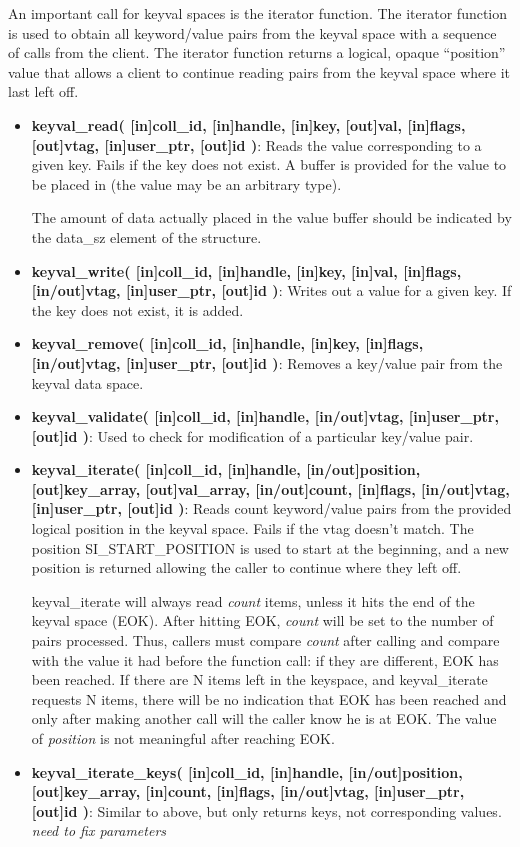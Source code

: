 \documentclass[10pt]{article} %
\begin{document}
An important call for keyval spaces is the iterator function.  The
iterator function is used to obtain all keyword/value pairs from the
keyval space with a sequence of calls from the client.  The iterator
function returns a logical, opaque ``position'' value that allows a
client to continue reading pairs from the keyval space where it last
left off.

\begin{itemize}
\item \textbf{keyval\_read(
[in]coll\_id,
[in]handle,
[in]key,
[out]val,
[in]flags,
[out]vtag,
[in]user\_ptr,
[out]id
)}:
Reads the value corresponding to a given key.  Fails if the key does
not exist.  A buffer is provided for the value to be placed in (the
value may be an arbitrary type).  

The amount of data actually placed in the value buffer should be indicated by
the data\_sz element of the structure.

\item \textbf{keyval\_write(
[in]coll\_id,
[in]handle,
[in]key,
[in]val,
[in]flags,
[in/out]vtag,
[in]user\_ptr,
[out]id
)}:
Writes out a value for a given key.  If the key does not exist, it is
added.  
\item \textbf{keyval\_remove(
[in]coll\_id,
[in]handle,
[in]key,
[in]flags,
[in/out]vtag,
[in]user\_ptr,
[out]id
)}:
Removes a key/value pair from the keyval data space.

\item \textbf{keyval\_validate(
[in]coll\_id,
[in]handle,
[in/out]vtag,
[in]user\_ptr,
[out]id
)}:
Used to check for modification of a particular key/value pair.
\item \textbf{keyval\_iterate(
[in]coll\_id,
[in]handle,
[in/out]position, 
[out]key\_array,
[out]val\_array,
[in/out]count,
[in]flags,
[in/out]vtag,
[in]user\_ptr,
[out]id
)}:
Reads count keyword/value pairs from the provided logical position in
the keyval space.  Fails if the vtag doesn't match.  The position
SI\_START\_POSITION is used to start at the beginning, and a new
position is returned allowing the caller to continue where they left
off.

keyval\_iterate will always read \emph{count} items, unless it hits the end
of the keyval space (EOK).  After hitting EOK, \emph{count} will be set to
the number of pairs processed.  Thus, callers must compare \emph{count}
after calling and compare with the value it had before the function call:
if they are different, EOK has been reached.  If there are N items left in
the keyspace, and keyval\_iterate requests N items, there will be no
indication that EOK has been reached and only after making another call
will the caller know he is at EOK.  The value of \emph{position} is not
meaningful after reaching EOK.

\item \textbf{keyval\_iterate\_keys(
[in]coll\_id,
[in]handle,
[in/out]position, 
[out]key\_array,
[in]count,
[in]flags,
[in/out]vtag,
[in]user\_ptr,
[out]id
)}:
Similar to above, but only returns keys, not corresponding values. \emph{need
to fix parameters}
\end{itemize}
\end{document}
